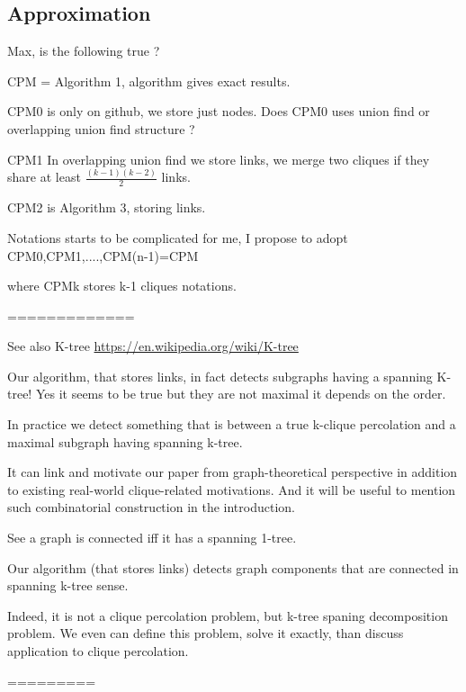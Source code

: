 
\subsection{Approximation}

{\color{red}

Max, is the following true ?

CPM = Algorithm 1, algorithm gives exact results.

\bigskip

CPM0 is only on github, we store just nodes.
Does CPM0 uses union find or overlapping union find structure ?

\bigskip

CPM1 In overlapping union find we store links, we merge two cliques 
     if they share at least $\frac{(k-1)(k-2)}{2}$ links.
     
\bigskip

CPM2 is Algorithm 3, storing links.

\bigskip

Notations starts to be complicated for me, I propose to adopt CPM0,CPM1,....,CPM(n-1)=CPM

where CPMk stores k-1 cliques
notations.

=============

See also  K-tree  \url{https://en.wikipedia.org/wiki/K-tree}

Our algorithm, that stores links, in fact
detects subgraphs having a spanning K-tree!
Yes it seems to be true but they are not maximal it depends on the order.

In practice we detect something that is between a true k-clique percolation
and a maximal subgraph having spanning k-tree.

It can link and motivate our paper from graph-theoretical perspective
in addition to existing real-world clique-related motivations. And it will be useful to mention such combinatorial construction in the introduction. 

See a graph is connected iff it has a spanning 1-tree.

Our algorithm (that stores links)
detects graph components that are connected in spanning k-tree sense.

Indeed, it is not a clique percolation problem, but k-tree spaning decomposition problem.
We even can define this problem, solve it exactly, than discuss application to clique
percolation.

=========


}

